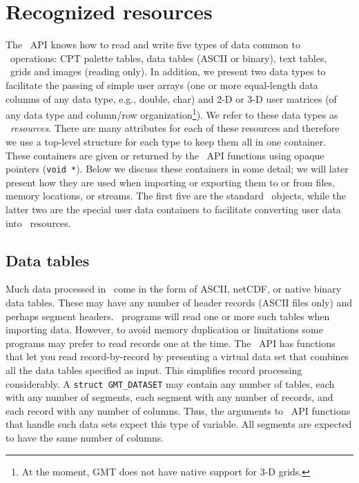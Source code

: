 \documentclass[11pt]{report}
\begin{document}
\section{Recognized resources}

The \GMT\ API knows how to read and write five types of data common to \GMT\ operations:
CPT palette tables, data tables (ASCII or binary), text tables, \GMT\ grids and images (reading only).
In addition, we present two data types to facilitate the passing of simple user arrays (one or more equal-length data columns
of any data type, e.g., double, char) and 2-D or 3-D user matrices (of any data type and column/row
organization\footnote{At the moment, GMT does not have native support for 3-D grids.}). We
refer to these data types as \GMT\ \emph{resources}.
There are many attributes for each of these resources and therefore we use a top-level structure for each type
to keep them all in one container.  These containers are given or returned by the \GMT\ API
functions using opaque pointers (\texttt{void *}).  Below we discuss these containers in some detail; we
will later present how they are used when importing or exporting them to or from files,
memory locations, or streams.  The first five are the standard \GMT\ objects, while the latter two are the
special user data containers to facilitate converting user data into \GMT\ resources.

\subsection{Data tables}

Much data processed in \GMT\ come in the form of ASCII, netCDF, or native binary data tables.  These may
have any number of header records (ASCII files only) and perhaps segment headers.  \GMT\ programs will
read one or more such tables when importing data.  However, to avoid memory duplication or limitations
some programs may prefer to read
records one at the time.  The \GMT\ API has functions that let you read record-by-record
by presenting a virtual data set that combines all the data tables specified as input.
This simplifies record processing considerably.  A \texttt{struct GMT\_DATASET} may contain
any number of tables, each with any number of segments, each segment with any number of records,
and each record with any number of columns.   Thus, the
arguments to \GMT\ API functions that handle such data sets expect this type of variable.  All segments
are expected to have the same number of columns.
\end{document}
